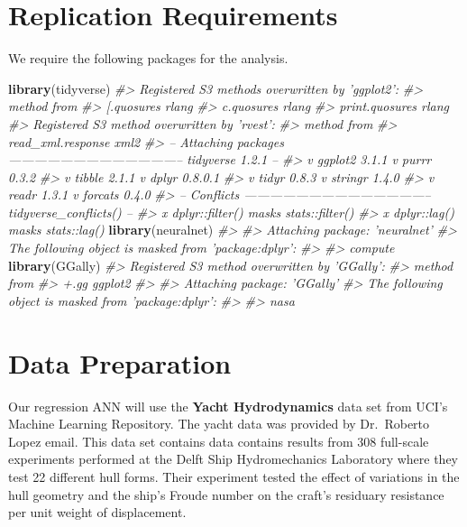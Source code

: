 \documentclass[]{book}
\newenvironment{Shaded}{\begin{snugshade}}{\end{snugshade}}
\newcommand{\CommentTok}[1]{\textcolor[rgb]{0.56,0.35,0.01}{\textit{#1}}}
\newcommand{\KeywordTok}[1]{\textcolor[rgb]{0.13,0.29,0.53}{\textbf{#1}}}
\newcommand{\NormalTok}[1]{#1}
\begin{document}
\hypertarget{replication-requirements}{%
\section{Replication Requirements}\label{replication-requirements}}

We require the following packages for the analysis.

\begin{Shaded}
\begin{Highlighting}[]
\KeywordTok{library}\NormalTok{(tidyverse)}
\CommentTok{#> Registered S3 methods overwritten by 'ggplot2':}
\CommentTok{#>   method         from }
\CommentTok{#>   [.quosures     rlang}
\CommentTok{#>   c.quosures     rlang}
\CommentTok{#>   print.quosures rlang}
\CommentTok{#> Registered S3 method overwritten by 'rvest':}
\CommentTok{#>   method            from}
\CommentTok{#>   read_xml.response xml2}
\CommentTok{#> -- Attaching packages ----------------------------------------- tidyverse 1.2.1 --}
\CommentTok{#> v ggplot2 3.1.1       v purrr   0.3.2  }
\CommentTok{#> v tibble  2.1.1       v dplyr   0.8.0.1}
\CommentTok{#> v tidyr   0.8.3       v stringr 1.4.0  }
\CommentTok{#> v readr   1.3.1       v forcats 0.4.0}
\CommentTok{#> -- Conflicts -------------------------------------------- tidyverse_conflicts() --}
\CommentTok{#> x dplyr::filter() masks stats::filter()}
\CommentTok{#> x dplyr::lag()    masks stats::lag()}
\KeywordTok{library}\NormalTok{(neuralnet)}
\CommentTok{#> }
\CommentTok{#> Attaching package: 'neuralnet'}
\CommentTok{#> The following object is masked from 'package:dplyr':}
\CommentTok{#> }
\CommentTok{#>     compute}
\KeywordTok{library}\NormalTok{(GGally)}
\CommentTok{#> Registered S3 method overwritten by 'GGally':}
\CommentTok{#>   method from   }
\CommentTok{#>   +.gg   ggplot2}
\CommentTok{#> }
\CommentTok{#> Attaching package: 'GGally'}
\CommentTok{#> The following object is masked from 'package:dplyr':}
\CommentTok{#> }
\CommentTok{#>     nasa}
\end{Highlighting}
\end{Shaded}

\hypertarget{data-preparation}{%
\section{Data Preparation}\label{data-preparation}}

Our regression ANN will use the \textbf{Yacht Hydrodynamics} data set from UCI's Machine Learning Repository. The yacht data was provided by Dr.~Roberto Lopez email. This data set contains data contains results from 308 full-scale experiments performed at the Delft Ship Hydromechanics Laboratory where they test 22 different hull forms. Their experiment tested the effect of variations in the hull geometry and the ship's Froude number on the craft's residuary resistance per unit weight of displacement.
\end{document}
